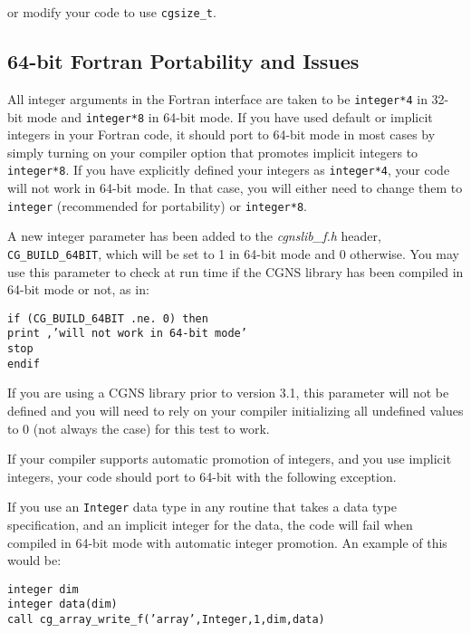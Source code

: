 \noindent or modify your code to use \texttt{cgsize\_t}.

\subsection{64-bit Fortran Portability and Issues}

All integer arguments in the Fortran interface are taken to be
\texttt{integer*4} in 32-bit mode and \texttt{integer*8}
in 64-bit mode. If you have used default or implicit integers in
your Fortran code, it should port to 64-bit mode in most cases by
simply turning on your compiler option that promotes implicit
integers to \texttt{integer*8}. If you have explicitly defined your
integers as \texttt{integer*4}, your code will not work in 64-bit mode.
In that case, you will either need to change them to \texttt{integer}
(recommended for portability) or \texttt{integer*8}.

A new integer parameter has been added to the \textit{cgnslib\_f.h}
header, \texttt{CG\_BUILD\_64BIT}, which will be set
to 1 in 64-bit mode and 0 otherwise. You may use this parameter
to check at run time if the CGNS library has been compiled in 64-bit
mode or not, as in:

\noindent \texttt{if (CG\_BUILD\_64BIT .ne. 0) then} \\
\indent \texttt{print \*,'will not work in 64-bit mode'} \\
\indent \texttt{stop} \\
\noindent \texttt{endif}

If you are using a CGNS library prior to version 3.1, this parameter will
not be defined and you will need to rely on your compiler initializing all
undefined values to 0 (not always the case) for this test to work.

If your compiler supports automatic promotion of integers, and you use
implicit integers, your code should port to 64-bit with the following exception.

If you use an \texttt{Integer} data type in any routine that takes
a data type specification, and an implicit integer for the data, the code
will fail when compiled in 64-bit mode with automatic integer promotion.
An example of this would be:

\noindent \texttt{integer dim} \\
\noindent \texttt{integer data(dim)} \\
\noindent \texttt{call cg\_array\_write\_f('array',Integer,1,dim,data)} \\

